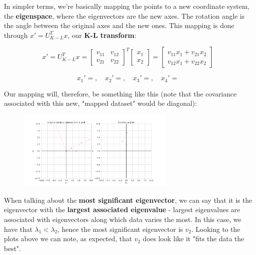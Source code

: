 \documentclass[12pt]{article}
\begin{document}
\begin{enumerate}[leftmargin=\labelsep]
  In simpler terms, we're basically mapping the points to a new coordinate system,
  the \textbf{eigenspace}, where the eigenvectors are the new axes. The rotation
  angle is the angle between the original axes and the new ones. This mapping is done
  through $x' = U_{K-L}^T x$, our \textbf{K-L transform}:

  \begin{equation*}
    x' = U_{K-L}^T x
    = \begin{bmatrix}
      v_{11} & v_{12} \\
      v_{21} & v_{22}
    \end{bmatrix}^T
    \begin{bmatrix}
      x_1 \\
      x_2
    \end{bmatrix}
    = \begin{bmatrix}
      v_{11} x_1 + v_{21} x_2 \\
      v_{12} x_1 + v_{22} x_2
    \end{bmatrix}
  \end{equation*}

  \begin{equation*}
    x_1' = , \quad x_2' = ,
    \quad x_3' = , \quad x_4' = 
  \end{equation*}

  Our mapping will, therefore, be something like this (note that
  the covariance associated with this new, "mapped dataset" would be diagonal):

  \begin{figure}[h]
    \centering
    \includegraphics[width=0.68\textwidth]{assets/ex-1/kl-transform.png}
    \label{fig:kl-transform}
  \end{figure}

  When talking about the \textbf{most significant eigenvector}, we can say that it is the
  eigenvector with the \textbf{largest associated eigenvalue} - largest eigenvalues
  are associated with eigenvectors along which data varies the most. In this case, we have that $\lambda_1 < \lambda_2$,
  hence the most significant eigenvector is $v_2$. Looking to the plots above we
  can note, as expected, that $v_2$ does look like it "fits the data the best".


\end{enumerate}
\end{document}
